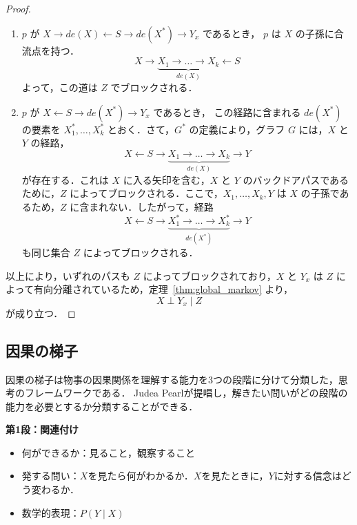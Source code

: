 \documentclass[uplatex, dvipdfmx]{jsarticle}
\begin{document}
\begin{proof}
\begin{enumerate}[label={(\roman*)}, leftmargin=*]
    \item $p$ が $X \rightarrow de(X) \leftarrow S \rightarrow de(X^*) \rightarrow Y_x$ であるとき，
    $p$ は $X$ の子孫に合流点を持つ．
    \begin{equation}
      X \rightarrow \underbrace{X_1 \rightarrow \dots \rightarrow X_k}_{de(X)} \leftarrow S
    \end{equation}
    よって，この道は $Z$ でブロックされる．

    \item $p$ が $X \leftarrow S \rightarrow de(X^*) \rightarrow Y_x$ であるとき，
    この経路に含まれる $de(X^*)$ の要素を $X_1^*, \dots, X_k^*$ とおく．さて，$G^*$ の定義により，グラフ $G$ には，$X$ と $Y$ の経路，
    \begin{equation}
      X \leftarrow S \rightarrow \underbrace{X_1 \rightarrow \dots \rightarrow X_k}_{de(X)} \rightarrow Y
    \end{equation}
    が存在する．これは $X$ に入る矢印を含む，$X$ と $Y$ のバックドアパスであるために，$Z$ によってブロックされる．ここで，$X_1, \dots, X_k, Y$ は $X$ の子孫であるため，$Z$ に含まれない．したがって，経路
    \begin{equation}
      X \leftarrow S \rightarrow \underbrace{X_1^* \rightarrow \dots \rightarrow X_k^*}_{de(X^*)} \rightarrow Y
    \end{equation}
    も同じ集合 $Z$ によってブロックされる． 
  \end{enumerate}

  以上により，いずれのパスも $Z$ によってブロックされており，$X$ と $Y_x$ は $Z$ によって有向分離されているため，定理~\ref{thm:global_markov} より，
  \begin{equation}
    X \perp Y_x \mid Z
  \end{equation}
  が成り立つ．
\end{proof}

\subsection*{因果の梯子}

因果の梯子は物事の因果関係を理解する能力を3つの段階に分けて分類した，思考のフレームワークである．
Judea Pearlが提唱し，解きたい問いがどの段階の能力を必要とするか分類することができる．

\noindent\textbf{第1段：関連付け}
\begin{itemize}
    \item 何ができるか：見ること，観察すること
    \item 発する問い：$X$を見たら何がわかるか．$X$を見たときに，$Y$に対する信念はどう変わるか．
    \item 数学的表現：$P(Y \mid X)$
\end{itemize}
\end{document}
